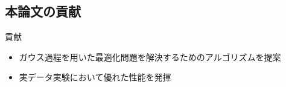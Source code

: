 \documentclass[dvipdfmx, 10.5pt]{beamer}
\begin{document}



\subsection{本論文の貢献}

\begin{frame}{\insertsubsection}

		\begin{block}{貢献}
			\begin{itemize}
				\item ガウス過程を用いた最適化問題を解決するためのアルゴリズムを提案
				\item 実データ実験において優れた性能を発揮
			\end{itemize}
		\end{block}



\end{frame}
\end{document}
